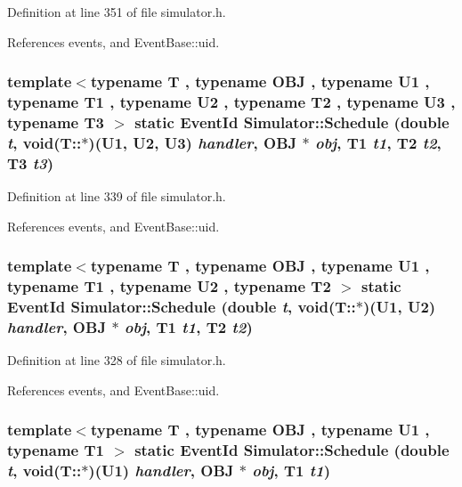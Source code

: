 Definition at line 351 of file simulator.h.

References events, and EventBase::uid.
\subsubsection[{Schedule}]{\setlength{\rightskip}{0pt plus 5cm}template$<$typename T , typename OBJ , typename U1 , typename T1 , typename U2 , typename T2 , typename U3 , typename T3 $>$ static {\bf EventId} Simulator::Schedule (double {\em t}, \/  void(T::$\ast$)(U1, U2, U3) {\em handler}, \/  OBJ $\ast$ {\em obj}, \/  T1 {\em t1}, \/  T2 {\em t2}, \/  T3 {\em t3})\hspace{0.3cm}{\tt  [inline, static]}}\label{classSimulator_f4102ccb431eea8143497cb92fb499d4}




Definition at line 339 of file simulator.h.

References events, and EventBase::uid.
\subsubsection[{Schedule}]{\setlength{\rightskip}{0pt plus 5cm}template$<$typename T , typename OBJ , typename U1 , typename T1 , typename U2 , typename T2 $>$ static {\bf EventId} Simulator::Schedule (double {\em t}, \/  void(T::$\ast$)(U1, U2) {\em handler}, \/  OBJ $\ast$ {\em obj}, \/  T1 {\em t1}, \/  T2 {\em t2})\hspace{0.3cm}{\tt  [inline, static]}}\label{classSimulator_bb9b661fcd4fcbb62c331ef07a53eb7d}




Definition at line 328 of file simulator.h.

References events, and EventBase::uid.
\subsubsection[{Schedule}]{\setlength{\rightskip}{0pt plus 5cm}template$<$typename T , typename OBJ , typename U1 , typename T1 $>$ static {\bf EventId} Simulator::Schedule (double {\em t}, \/  void(T::$\ast$)(U1) {\em handler}, \/  OBJ $\ast$ {\em obj}, \/  T1 {\em t1})\hspace{0.3cm}{\tt  [inline, static]}}\label{classSimulator_f483426f923de97d0f71ff88beceedbe}





